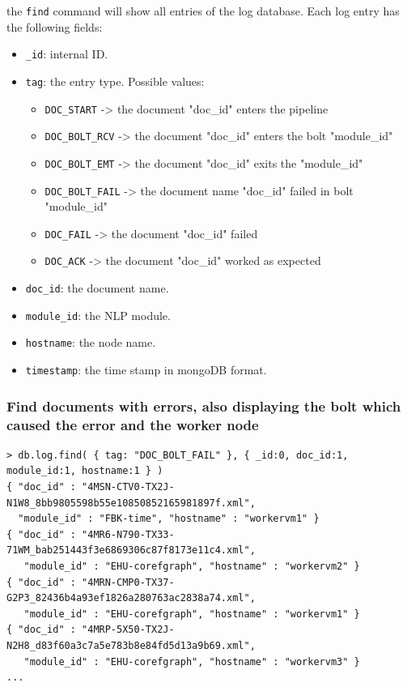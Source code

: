 \documentclass[a4]{article}
\begin{document}
the \texttt{find} command will show all entries of the log database. Each
log entry has the following fields:
\begin{itemize}
\item \texttt{\_id}: internal ID.
\item \texttt{tag}: the entry type. Possible values:
  \begin{itemize}
  \item \texttt{DOC\_START}    -> the document "doc\_id" enters the pipeline
  \item \texttt{DOC\_BOLT\_RCV} -> the document "doc\_id" enters the bolt  "module\_id"
  \item \texttt{DOC\_BOLT\_EMT} -> the document "doc\_id" exits the "module\_id"
  \item \texttt{DOC\_BOLT\_FAIL} -> the document name "doc\_id" failed in bolt "module\_id"
  \item \texttt{DOC\_FAIL} -> the document "doc\_id" failed
  \item \texttt{DOC\_ACK} -> the document "doc\_id" worked as expected
  \end{itemize}
\item \texttt{doc\_id}: the document name.
\item \texttt{module\_id}: the NLP module.
\item \texttt{hostname}: the node name.
\item \texttt{timestamp}: the time stamp in mongoDB format.
\end{itemize}

\subsubsection*{Find documents with errors, also displaying the bolt which caused the error and the worker node}

\begin{verbatim}
> db.log.find( { tag: "DOC_BOLT_FAIL" }, { _id:0, doc_id:1, module_id:1, hostname:1 } )
{ "doc_id" : "4MSN-CTV0-TX2J-N1W8_8bb9805598b55e10850852165981897f.xml", 
  "module_id" : "FBK-time", "hostname" : "workervm1" }
{ "doc_id" : "4MR6-N790-TX33-71WM_bab251443f3e6869306c87f8173e11c4.xml", 
   "module_id" : "EHU-corefgraph", "hostname" : "workervm2" }
{ "doc_id" : "4MRN-CMP0-TX37-G2P3_82436b4a93ef1826a280763ac2838a74.xml", 
   "module_id" : "EHU-corefgraph", "hostname" : "workervm1" }
{ "doc_id" : "4MRP-5X50-TX2J-N2H8_d83f60a3c7a5e783b8e84fd5d13a9b69.xml", 
   "module_id" : "EHU-corefgraph", "hostname" : "workervm3" }
...
\end{verbatim}
\end{document}
